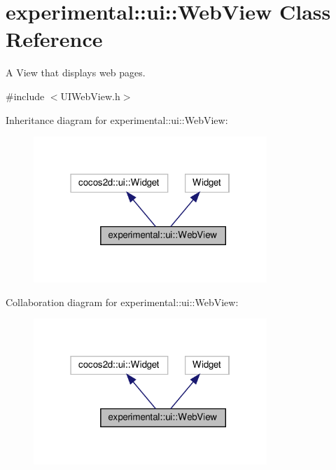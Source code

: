 \hypertarget{classexperimental_1_1ui_1_1WebView}{}\section{experimental\+:\+:ui\+:\+:Web\+View Class Reference}
\label{classexperimental_1_1ui_1_1WebView}


A View that displays web pages.  




{\ttfamily \#include $<$U\+I\+Web\+View.\+h$>$}



Inheritance diagram for experimental\+:\+:ui\+:\+:Web\+View\+:
\nopagebreak
\begin{figure}[H]
\begin{center}
\leavevmode
\includegraphics[width=250pt]{classexperimental_1_1ui_1_1WebView__inherit__graph}
\end{center}
\end{figure}


Collaboration diagram for experimental\+:\+:ui\+:\+:Web\+View\+:
\nopagebreak
\begin{figure}[H]
\begin{center}
\leavevmode
\includegraphics[width=250pt]{classexperimental_1_1ui_1_1WebView__coll__graph}
\end{center}
\end{figure}
